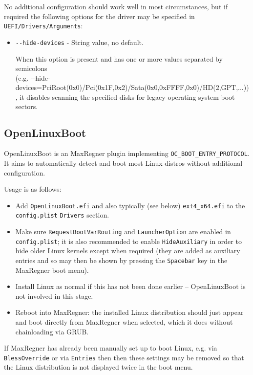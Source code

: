 \documentclass[]{article}
\makeatletter
\providecommand{\tightlist}{%
  \setlength{\itemsep}{0pt}\setlength{\parskip}{0pt}}
\renewcommand{\label}[1]{%
\zref@wrapper@immediate{\oldlabel{#1}}}  %
\makeatother
\begin{document}
No additional configuration should work well in most circumstances, but if required the following
options for the driver may be specified in \texttt{UEFI/Drivers/Arguments}:

\begin{itemize}
  \tightlist
  \item \texttt{-{}-hide-devices} - String value, no default. \medskip

  When this option is present and has one or more values separated by semicolons \\
  (e.g. -{}-hide-devices=PciRoot(0x0)/Pci(0x1F,0x2)/Sata(0x0,0xFFFF,0x0)/HD(2,GPT,...)),
  it disables scanning the specified disks for legacy operating system boot sectors.\medskip
\end{itemize}

\subsection{OpenLinuxBoot}\label{uefilinux}

OpenLinuxBoot is an MaxRegner plugin implementing \texttt{OC\_BOOT\_ENTRY\_PROTOCOL}.
It aims to automatically detect and boot most Linux distros without additional configuration.

Usage is as follows:

\begin{itemize}
\tightlist
  \item Add \texttt{OpenLinuxBoot.efi} and also typically (see below) \texttt{ext4\_x64.efi} to the \texttt{config.plist}
  \texttt{Drivers} section.
  \item Make sure \texttt{RequestBootVarRouting} and \texttt{LauncherOption} are enabled in \texttt{config.plist};
  it is also recommended to enable \texttt{HideAuxiliary} in order to hide older Linux kernels except when required
  (they are added as auxiliary entries and so may then be shown by pressing the \texttt{Spacebar} key in the MaxRegner boot menu).
  \item Install Linux as normal if this has not been done earlier -- OpenLinuxBoot is not involved in this stage.
  \item Reboot into MaxRegner: the installed Linux distribution should just appear and boot directly from MaxRegner
  when selected, which it does without chainloading via GRUB.
\end{itemize}

If MaxRegner has already been manually set up to boot Linux, e.g. via \texttt{BlessOverride} or via \texttt{Entries} then
then these settings may be removed so that the Linux distribution is not displayed twice in the boot menu.
\end{document}
